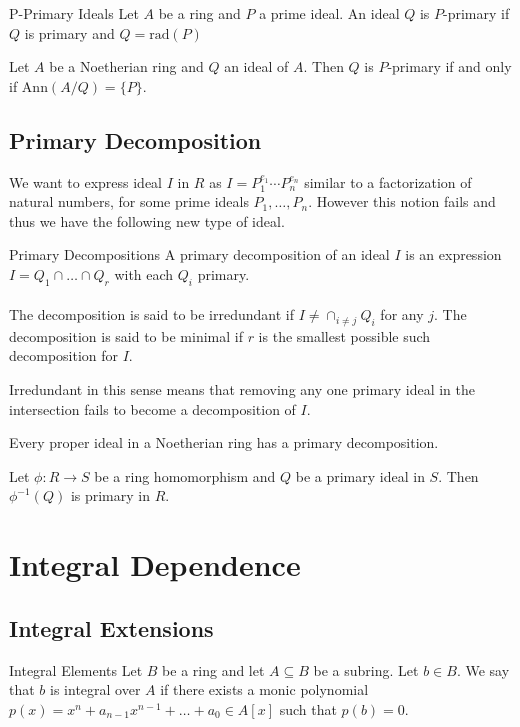 \documentclass[a4paper]{article}
\begin{document}
\begin{defn}{P-Primary Ideals}{} Let $A$ be a ring and $P$ a prime ideal. An ideal $Q$ is $P$-primary if $Q$ is primary and $Q=\text{rad}(P)$
\end{defn}

\begin{thm}{}{} Let $A$ be a Noetherian ring and $Q$ an ideal of $A$. Then $Q$ is $P$-primary if and only if $\text{Ann}(A/Q)=\{P\}$. 
\end{thm}

\subsection{Primary Decomposition}
We want to express ideal $I$ in $R$ as $I=P_1^{e_1}\cdots P_n^{e_n}$ similar to a factorization of natural numbers, for some prime ideals $P_1,\dots,P_n$. However this notion fails and thus we have the following new type of ideal. 

\begin{defn}{Primary Decompositions}{} A primary decomposition of an ideal $I$ is an expression $I=Q_1\cap\dots\cap Q_r$ with each $Q_i$ primary. \\~\\
The decomposition is said to be irredundant if $I\neq\cap_{i\neq j}Q_i$ for any $j$. The decomposition is said to be minimal if $r$ is the smallest possible such decomposition for $I$. 
\end{defn}

Irredundant in this sense means that removing any one primary ideal in the intersection fails to become a decomposition of $I$. 

\begin{thm}{}{} Every proper ideal in a Noetherian ring has a primary decomposition. 
\end{thm}

\begin{lmm}{}{} Let $\phi:R\to S$ be a ring homomorphism and $Q$ be a primary ideal in $S$. Then $\phi^{-1}(Q)$ is primary in $R$. 
\end{lmm}

\pagebreak
\section{Integral Dependence}
\subsection{Integral Extensions}
\begin{defn}{Integral Elements}{} Let $B$ be a ring and let $A\subseteq B$ be a subring. Let $b\in B$. We say that $b$ is integral over $A$ if there exists a monic polynomial $p(x)=x^n+a_{n-1}x^{n-1}+\dots+a_0\in A[x]$ such that $p(b)=0$. 
\end{defn}
\end{document}
